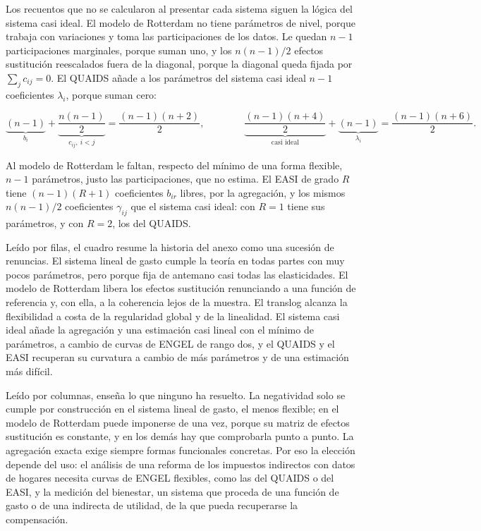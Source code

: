 \documentclass[10pt,a4paper]{article}
\newcounter{anexo}
\begin{document}
Los recuentos que no se calcularon al presentar cada sistema siguen la lógica del sistema casi ideal. El modelo de Rotterdam no tiene parámetros de nivel, porque trabaja con variaciones y toma las participaciones de los datos. Le quedan $n-1$ participaciones marginales, porque suman uno, y los $n(n-1)/2$ efectos sustitución reescalados fuera de la diagonal, porque la diagonal queda fijada por $\sum_jc_{ij}=0$. El QUAIDS añade a los parámetros del sistema casi ideal $n-1$ coeficientes $\lambda_i$, porque suman cero:

$$\underbrace{(n-1)}_{b_i}+\underbrace{\frac{n(n-1)}{2}}_{c_{ij},\ i<j}=\frac{(n-1)(n+2)}{2},\qquad\qquad \underbrace{\frac{(n-1)(n+4)}{2}}_{\text{casi ideal}}+\underbrace{(n-1)}_{\lambda_i}=\frac{(n-1)(n+6)}{2}.$$

Al modelo de Rotterdam le faltan, respecto del mínimo de una forma flexible, $n-1$ parámetros, justo las participaciones, que no estima. El EASI de grado $R$ tiene $(n-1)(R+1)$ coeficientes $b_{ir}$ libres, por la agregación, y los mismos $n(n-1)/2$ coeficientes $\gamma_{ij}$ que el sistema casi ideal: con $R=1$ tiene sus parámetros, y con $R=2$, los del QUAIDS.

Leído por filas, el cuadro resume la historia del anexo como una sucesión de renuncias. El sistema lineal de gasto cumple la teoría en todas partes con muy pocos parámetros, pero porque fija de antemano casi todas las elasticidades. El modelo de Rotterdam libera los efectos sustitución renunciando a una función de referencia y, con ella, a la coherencia lejos de la muestra. El translog alcanza la flexibilidad a costa de la regularidad global y de la linealidad. El sistema casi ideal añade la agregación y una estimación casi lineal con el mínimo de parámetros, a cambio de curvas de ENGEL de rango dos, y el QUAIDS y el EASI recuperan su curvatura a cambio de más parámetros y de una estimación más difícil.

Leído por columnas, enseña lo que ninguno ha resuelto. La negatividad solo se cumple por construcción en el sistema lineal de gasto, el menos flexible; en el modelo de Rotterdam puede imponerse de una vez, porque su matriz de efectos sustitución es constante, y en los demás hay que comprobarla punto a punto. La agregación exacta exige siempre formas funcionales concretas. Por eso la elección depende del uso: el análisis de una reforma de los impuestos indirectos con datos de hogares necesita curvas de ENGEL flexibles, como las del QUAIDS o del EASI, y la medición del bienestar, un sistema que proceda de una función de gasto o de una indirecta de utilidad, de la que pueda recuperarse la compensación.
\end{document}
